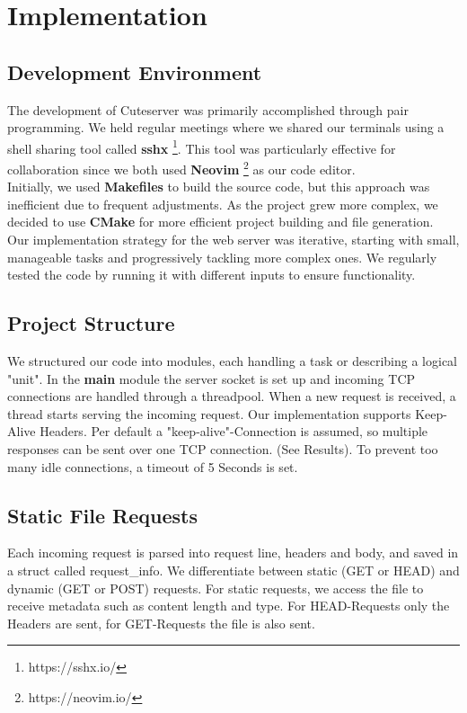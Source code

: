 \section*{Implementation}

\subsection*{Development Environment} 
The development of Cuteserver was primarily accomplished through pair programming. We held regular meetings where we shared our terminals using a shell sharing tool called \textbf{sshx} \footnote{https://sshx.io/}. This tool was particularly effective for collaboration since we both used \textbf{Neovim} \footnote{https://neovim.io/} as our code editor. \\
 
Initially, we used \textbf{Makefiles} to build the source code, but this approach was inefficient due to frequent adjustments. As the project grew more complex, we decided to use \textbf{CMake} for more efficient project building and file generation. \\

Our implementation strategy for the web server was iterative, starting with small, manageable tasks and progressively tackling more complex ones. We regularly tested the code by running it with different inputs to ensure functionality.

\subsection*{Project Structure} 
We structured our code into modules, each handling a task or describing a logical "unit". In the \textbf{main} module the server socket is set up and incoming TCP connections are handled through a threadpool. When a new request is received, a thread starts serving the incoming request. Our implementation supports Keep-Alive Headers. Per default a "keep-alive"-Connection is assumed, so multiple responses can be sent over one TCP connection. (See Results). To prevent too many idle connections, a timeout of 5 Seconds is set. 

\subsection*{Static File Requests}
Each incoming request is parsed into request line, headers and body, and saved in a struct called request\_info. We differentiate between static (GET or HEAD) and dynamic (GET or POST) requests. 
For static requests, we access the file to receive metadata such as content length and type. For HEAD-Requests only the Headers are sent, for GET-Requests the file is also sent.  

